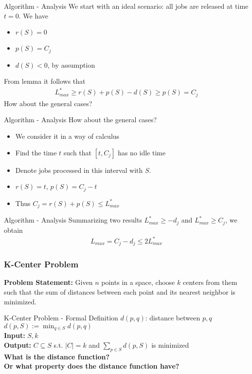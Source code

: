 \documentclass{beamer}
\begin{document}
\begin{frame}{Algorithm - Analysis}
    We start with an ideal scenario: all jobs are released at time $t = 0$. We have 
    \begin{itemize}
        \item $r(S) = 0$ 
        \item $p(S) = C_j$ 
        \item $d(S) < 0$, by assumption
    \end{itemize}
    From lemma it follows that 
    \begin{align*}
        L_{max}^* \geq r(S) + p(S) - d(S) \geq p(S) = C_j
    \end{align*}
    \pause
    \color{red} How about the general cases? \color{black}
\end{frame}

\begin{frame}{Algorithm - Analysis}
    \color{red} How about the general cases? \color{black} 
    \begin{itemize}
        \item<1-> We consider it in a way of calculus
        \item<2-> Find the time $t$ such that $[t, C_j]$ has no idle time 
        \item<3-> Denote jobs processed in this interval with $S$.
        \item<4-> $r(S) = t$, $p(S) = C_j - t$ 
        \item<5> Thus $C_j = r(S) + p(S) \leq L_{max}^*$ 
    \end{itemize}
\end{frame}

\begin{frame}{Algorithm - Analysis} 
    Summarizing two results $L_{max}^* \geq -d_j$ and $L_{max}^* \geq C_j$, we obtain
    \begin{align*}
        L_{max} = C_j - d_j \leq 2L_{max}^*
    \end{align*}
\end{frame} 

\begin{frame}
    \frametitle{K-Center Problem}
    \textbf{Problem Statement:} Given $n$ points in a space, 
    choose $k$ centers from them such that the sum of distances between 
    each point and its nearest neighbor is minimized. 
\end{frame}

\begin{frame}{K-Center Problem - Formal Definition}
    $d(p, q)$: distance between $p, q$ \\ 
    $d(p, S) := \min_{q \in S} d(p, q)$ \\
    \textbf{Input:} $S, k$ \\
    \textbf{Output:} $C \subseteq S$ s.t. $|C| = k$ and  $\sum_{p \in S} d(p, S)$ 
    is minimized \\[20pt]
    \pause 
    \textbf{What is the distance function? \\ Or what property does the distance function have?}
\end{frame}
\end{document}
